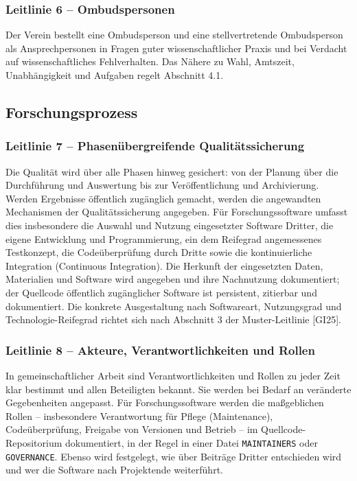 \documentclass[a4paper, fontsize=11pt]{scrartcl}
\begin{document}
\subsubsection*{Leitlinie 6 -- Ombudspersonen}
Der Verein bestellt eine Ombudsperson und eine stellvertretende Ombudsperson als Ansprechpersonen in Fragen guter wissenschaftlicher Praxis und bei Verdacht auf wissenschaftliches Fehlverhalten. Das Nähere zu Wahl, Amtszeit, Unabhängigkeit und Aufgaben regelt Abschnitt 4.1.

\subsection{Forschungsprozess}

\subsubsection*{Leitlinie 7 -- Phasenübergreifende Qualitätssicherung}
Die Qualität wird über alle Phasen hinweg gesichert: von der Planung über die Durchführung und Auswertung bis zur Veröffentlichung und Archivierung. Werden Ergebnisse öffentlich zugänglich gemacht, werden die angewandten Mechanismen der Qualitätssicherung angegeben. Für Forschungssoftware umfasst dies insbesondere die Auswahl und Nutzung eingesetzter Software Dritter, die eigene Entwicklung und Programmierung, ein dem Reifegrad angemessenes Testkonzept, die Codeüberprüfung durch Dritte sowie die kontinuierliche Integration (Continuous Integration). Die Herkunft der eingesetzten Daten, Materialien und Software wird angegeben und ihre Nachnutzung dokumentiert; der Quellcode öffentlich zugänglicher Software ist persistent, zitierbar und dokumentiert. Die konkrete Ausgestaltung nach Softwareart, Nutzungsgrad und Technologie-Reifegrad richtet sich nach Abschnitt 3 der Muster-Leitlinie [GI25].

\subsubsection*{Leitlinie 8 -- Akteure, Verantwortlichkeiten und Rollen}
In gemeinschaftlicher Arbeit sind Verantwortlichkeiten und Rollen zu jeder Zeit klar bestimmt und allen Beteiligten bekannt. Sie werden bei Bedarf an veränderte Gegebenheiten angepasst. Für Forschungssoftware werden die maßgeblichen Rollen -- insbesondere Verantwortung für Pflege (Maintenance), Codeüberprüfung, Freigabe von Versionen und Betrieb -- im Quellcode-Repositorium dokumentiert, in der Regel in einer Datei \texttt{MAINTAINERS} oder \texttt{GOVERNANCE}. Ebenso wird festgelegt, wie über Beiträge Dritter entschieden wird und wer die Software nach Projektende weiterführt.
\end{document}
